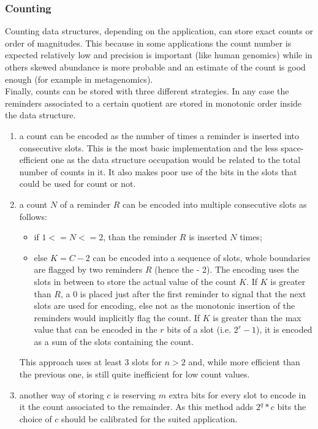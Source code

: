 \subsubsection{Counting}
\label{sec:rsqfcount}
Counting data structures, depending on the application, can store exact counts or order of magnitudes. This because in some applications the count number is expected relatively low and precision is important (like human genomics) while in others skewed abundance is more probable and an estimate of the count is good enough (for example in metagenomics).\\
Finally, counts can be stored with three different strategies. In any case the reminders associated to a certain quotient are stored in monotonic order inside the data structure.
\begin{enumerate}
	\item  a count can be encoded as the number of times a reminder is inserted into consecutive slots. This is the most basic implementation and the less space-efficient one as the data structure occupation would be related to the total number of counts in it. It also makes poor use of the bits in the slots that could be used for count or not.
	\item a count $N$ of a reminder $R$ can be encoded into multiple consecutive slots as follows: 
	\begin{itemize}
		\item if $1 <= N <= 2$, than the reminder $R$ is inserted $N$ times;
		\item else $K = C - 2$ can be encoded into a sequence of slots, whole boundaries are flagged by two reminders $R$ (hence the - 2). The encoding uses the slots in between to store the actual value of the count $K$. If $K$ is greater than $R$, a 0 is placed just after the first reminder to signal that the next slots are used for encoding, else not as the monotonic insertion of the reminders would implicitly flag the count. If $K$ is greater than the max value that can be encoded in the $r$ bits of a slot (i.e. $2^r -1$), it is encoded as a sum of the slots containing the count. 
	\end{itemize}
	This approach uses at least 3 slots for $n>2$ and, while more efficient than the previous one, is still quite inefficient for low count values.
	\item another way of storing $c$ is reserving $m$ extra bits for every slot to encode in it the count associated to the remainder. As this method adds $2^q * c$ bits the choice of $c$ should be calibrated for the suited application. 
\end{enumerate}

